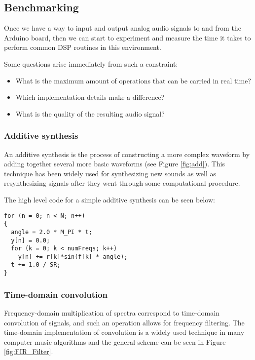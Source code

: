 \subsection{Benchmarking}

Once we have a way to input and output analog audio signals to and from the
Arduino board, then we can start to experiment and measure the time it takes
to perform common DSP routines in this environment.

Some questions arise immediately from such a constraint:

\begin{itemize}
    \item What is the maximum amount of operations that can be carried in real
    time?
    \item Which implementation details make a difference?
    \item What is the quality of the resulting audio signal?
\end{itemize}

\subsubsection{Additive synthesis}

An additive synthesis is the process of constructing a more complex waveform
by adding together several more basic waveforms (see Figure \ref{fig:add}).
This technique has been widely used for synthesizing new sounds as well as
resynthesizing signals after they went through some computational procedure.



The high level code for a simple additive synthesis can be seen below:

\begin{lstlisting}[caption=Additive synthesis algorithm.]
for (n = 0; n < N; n++)
{
  angle = 2.0 * M_PI * t;
  y[n] = 0.0;
  for (k = 0; k < numFreqs; k++)
    y[n] += r[k]*sin(f[k] * angle);
  t += 1.0 / SR;
}
\end{lstlisting}

\subsubsection{Time-domain convolution}

Frequency-domain multiplication of spectra correspond to time-domain
convolution of signals, and such an operation allows for frequency filtering.
The time-domain implementation of convolution is a widely used technique in
many computer music algorithms and the general scheme can be seen in Figure
\ref{fig:FIR_Filter}.

